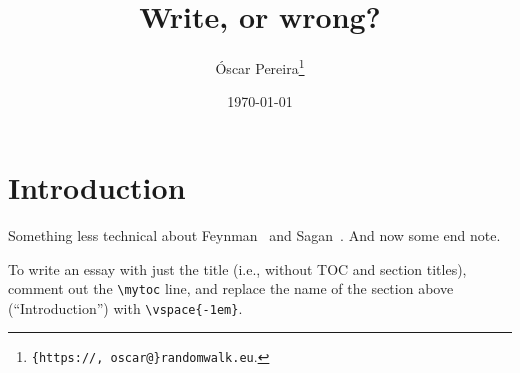 \documentclass[a4paper,12pt,dvipsnames*]{article}
\title{
Write, or wrong?
}
\author{%
Óscar Pereira\footnote{\texttt{\{https://, oscar@\}randomwalk.eu}.}
}
\date{{\small\today}\vspace{-2em}}
\begin{document}
\maketitle

\mytoc

\section{Introduction}
  \label{sec:intro}
  Something less technical about Feynman~\cite{Feynman74} and Sagan~\cite{Sagan}. And now some end note.

  To write an essay with just the title (i.e., without TOC and section titles), comment out the \verb+\mytoc+ line, and replace the name of the section above (``Introduction'') with \verb+\vspace{-1em}+.

\iffootnotesonly
\else
  \printendnotes
\fi

{}


\end{document}
